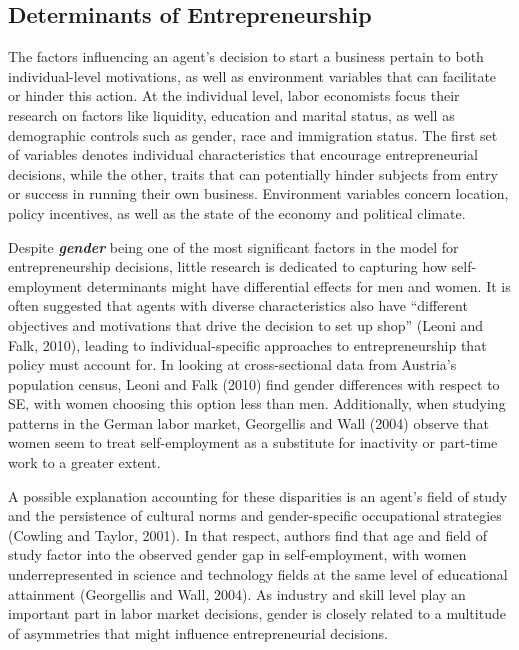 \subsection{Determinants of Entrepreneurship}

The factors influencing an agent’s decision to start a business pertain to both individual-level motivations, as well as environment variables that can facilitate or hinder this action. At the individual level, labor economists focus their research on factors like liquidity, education and marital status, as well as demographic controls such as gender, race and immigration status. The first set of variables denotes individual characteristics that encourage entrepreneurial decisions, while the other, traits that can potentially hinder subjects from entry or success in running their own business. Environment variables concern location, policy incentives, as well as the state of the economy and political climate. 


Despite \textbf{\textit{gender}} being one of the most significant factors in the model for entrepreneurship decisions, little research is dedicated to capturing how self-employment determinants might have differential effects for men and women. It is often suggested that agents with diverse characteristics also have “different objectives and motivations that drive the decision to set up shop” (Leoni and Falk, 2010), leading to individual-specific approaches to entrepreneurship that policy must account for. In looking at cross-sectional data from Austria’s population census, Leoni and Falk (2010) find gender differences with respect to SE, with women choosing this option less than men. Additionally, when studying patterns in the German labor market, Georgellis and Wall (2004) observe that women seem to treat self-employment as a substitute for inactivity or part-time work to a greater extent. 

A possible explanation accounting for these disparities is an agent’s field of study and the persistence of cultural norms and gender-specific occupational strategies (Cowling and Taylor, 2001). In that respect, authors find that age and field of study factor into the observed gender gap in self-employment, with women underrepresented in science and technology fields at the same level of educational attainment (Georgellis and Wall, 2004).  As industry and skill level play an important part in labor market decisions, gender is closely related to a multitude of asymmetries that might influence entrepreneurial decisions. 

